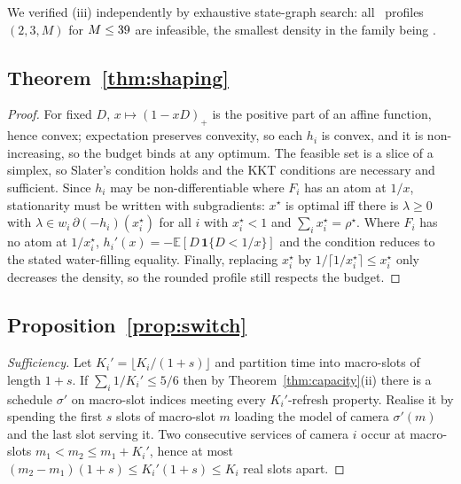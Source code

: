 \documentclass[final,5p,times,twocolumn]{elsarticle}
\theoremstyle{definition}
\newcommand{\Ki}{K_i}
\newcommand{\dens}{\rho}
\newcommand{\sched}{\sigma}
\newcommand{\Dur}{D}
\newcommand{\pos}[1]{(#1)_{+}}
\begin{document}
\noindent
We verified (iii) independently by exhaustive state-graph search: all \numConeN\ profiles
$(2,3,M)$ for $M\le39$ are infeasible, the smallest density in the family being
\numConeRhoMin.

\subsection*{Theorem~\ref{thm:shaping}}
\begin{proof}
For fixed $\Dur$, $x\mapsto\pos{1-x\Dur}$ is the positive part of an affine function, hence convex;
expectation preserves convexity, so each $h_i$ is convex, and it is non-increasing, so the budget
binds at any optimum. The feasible set is a slice of a simplex, so Slater's condition holds and
the KKT conditions are necessary and sufficient. Since $h_i$ may be non-differentiable where $F_i$
has an atom at $1/x$, stationarity must be written with subgradients: $x^\star$ is optimal iff
there is $\lambda\ge0$ with $\lambda\in w_i\,\partial(-h_i)(x_i^\star)$ for all $i$ with
$x_i^\star<1$ and $\sum_i x_i^\star=\dens^\star$. Where $F_i$ has no atom at $1/x_i^\star$,
$h_i'(x)=-\mathbb{E}[\Dur\,\mathbf 1\{\Dur<1/x\}]$ and the condition reduces to the stated
water-filling equality. Finally, replacing $x_i^\star$ by $1/\lceil 1/x_i^\star\rceil\le x_i^\star$
only decreases the density, so the rounded profile still respects the budget.
\end{proof}

\subsection*{Proposition~\ref{prop:switch}}
\begin{proof}[Sufficiency]
Let $K_i'=\lfloor \Ki/(1+s)\rfloor$ and partition time into macro-slots of length $1+s$. If
$\sum_i 1/K_i'\le5/6$ then by Theorem~\ref{thm:capacity}(ii) there is a schedule $\sched'$ on
macro-slot indices meeting every $K_i'$-refresh property. Realise it by spending the first $s$
slots of macro-slot $m$ loading the model of camera $\sched'(m)$ and the last slot serving it. Two
consecutive services of camera $i$ occur at macro-slots $m_1<m_2\le m_1+K_i'$, hence at most
$(m_2-m_1)(1+s)\le K_i'(1+s)\le \Ki$ real slots apart.
\end{proof}
\end{document}

